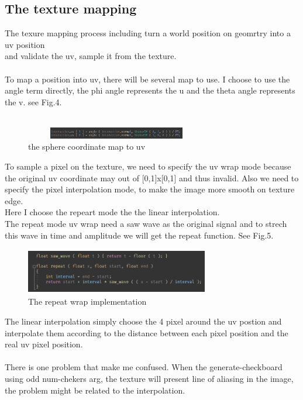 \documentclass[acmtog]{acmart}
\begin{document}
\subsection{The texture mapping}
\quad The texure mapping process including turn a world position on geomrtry into a uv position\\
and validate the uv, sample it from the texture.\\\\
\quad To map a position into uv, there will be several map to use. I choose to use the angle term directly, the phi angle represents the u and the theta angle represents the v. see Fig.4.\\\\
	\begin{figure}[h]
		\centering
		\includegraphics[width=8cm,height=0.5cm]{map.png}
		\caption{the sphere coordinate map to uv}
	\end{figure}
\quad To sample a pixel on the texture, we need to specify the uv wrap mode because the original uv coordinate may out of [0,1]x[0,1] and thus invalid. Also we need to specify the pixel interpolation mode, to make the image more smooth on texture edge.\\
\quad Here I choose the repeart mode the the linear interpolation.\\
The repeat mode uv wrap need a saw wave as the original signal and to strech this wave in time and amplitude we will get the repeat function. See Fig.5.\\
 	\begin{figure}[h]
		\centering
		\includegraphics[width=8cm,height=2cm]{repeat.png}
		\caption{The repeat wrap implementation}
	\end{figure}
The linear interpolation simply choose the 4 pixel around the uv postion and interpolate them according to the distance between each pixel position and the real uv pixel position.\\\\
\quad There is one problem that make me confused. When the generate-checkboard using odd num-chekers arg, the texture will present line of aliasing in the image, the problem might be related to the interpolation.
\end{document}
